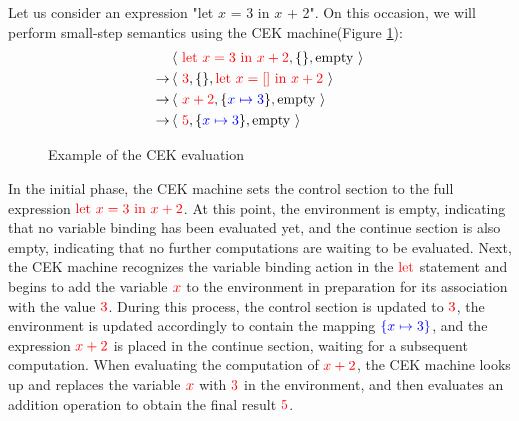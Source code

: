 \documentclass{l4proj}
\begin{document}
Let us consider an expression "let $x$ = 3 in $x$ + 2". On this occasion, we will perform small-step semantics using the CEK machine(Figure \ref{fig:cekExample}):
\begin{align*}
& \left \langle\ \textcolor{red}{\text{let } x = 3 \text{ in } x + 2},  \{\},  \text{empty} \ \right  \rangle \\
\rightarrow & \left \langle\ \textcolor{red}{3},  \{\},  \textcolor{red}{\text{let } x = [] \text{ in } x + 2} \ \right \rangle \\
\rightarrow & \left \langle\ \textcolor{red}{x + 2},  \{\textcolor{blue}{x \mapsto 3}\},  \text{empty} \ \right \rangle \\
\rightarrow & \left \langle\ \textcolor{red}{5},  \{\textcolor{blue}{x \mapsto 3}\},  \text{empty}\ \right \rangle
\end{align*}
\vspace{-1\baselineskip} 
\begin{figure}[ht]
    \caption{Example of the CEK evaluation}
    \label{fig:cekExample}
\end{figure}
\vspace{-1\baselineskip} 

In the initial phase, the CEK machine sets the control section to the full expression $\color{red}{\text{let } x = 3 \text{ in } x + 2}$. At this point, the environment is empty, indicating that no variable binding has been evaluated yet, and the continue section is also empty, indicating that no further computations are waiting to be evaluated. Next, the CEK machine recognizes the variable binding action in the $\color{red}{\text{let}}$ statement and begins to add the variable $\color{red}{x}$ to the environment in preparation for its association with the value $\color{red}{3}$. During this process, the control section is updated to $\color{red}{3}$, the environment is updated accordingly to contain the mapping $\color{blue}{\{x \mapsto 3\}}$, and the expression $\color{red}{x + 2}$ is placed in the continue section, waiting for a subsequent computation. When evaluating the computation of $\color{red}{x + 2}$, the CEK machine looks up and replaces the variable $\color{red}{x}$ with $\color{red}{3}$ in the environment, and then evaluates an addition operation to obtain the final result $\color{red}{5}$.
\end{document}
